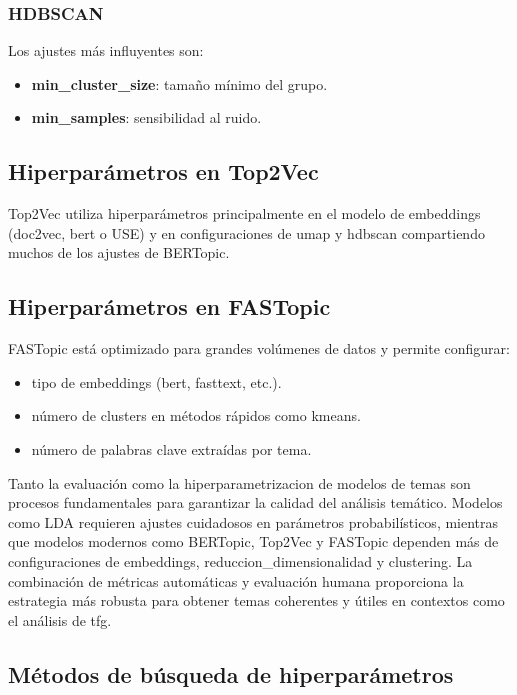 \subsubsection{HDBSCAN}

Los ajustes más influyentes son:
\begin{itemize}
	\item \textbf{min\_cluster\_size}: tamaño mínimo del grupo.
	\item \textbf{min\_samples}: sensibilidad al ruido.
\end{itemize}

\subsection{Hiperparámetros en Top2Vec}

Top2Vec utiliza hiperparámetros principalmente en el modelo de \gls{embeddings}
(\gls{doc2vec}, \acrshort{bert} o USE) y en configuraciones de \acrshort{umap}
y \acrshort{hdbscan} compartiendo muchos de los ajustes de BERTopic.

\subsection{Hiperparámetros en FASTopic}

FASTopic está optimizado para grandes volúmenes de datos y permite configurar:
\begin{itemize}
	\item tipo de embeddings (\acrshort{bert}, \gls{fasttext}, etc.).
	\item número de clusters en métodos rápidos como \gls{kmeans}.
	\item número de palabras clave extraídas por tema.
\end{itemize}

Tanto la evaluación como la \gls{hiperparametrizacion} de modelos de temas son
procesos fundamentales para garantizar la calidad del análisis temático.
Modelos como LDA requieren ajustes cuidadosos en parámetros probabilísticos,
mientras que modelos modernos como BERTopic, Top2Vec y FASTopic dependen más de
configuraciones de \gls{embeddings}, \gls{reduccion_dimensionalidad} y
\gls{clustering}. La combinación de métricas automáticas y evaluación humana
proporciona la estrategia más robusta para obtener temas coherentes y útiles en
contextos como el análisis de \acrshort{tfg}.

\subsection{Métodos de búsqueda de hiperparámetros}

